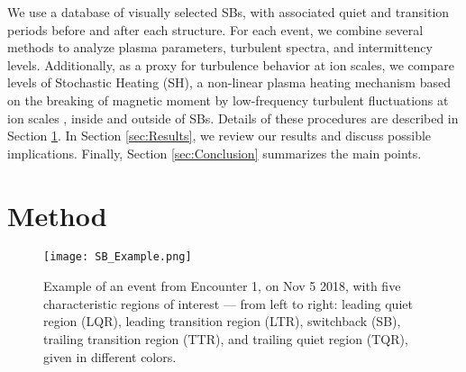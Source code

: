 \documentclass[]{aastex62}
\begin{document}
We use a database of visually selected SBs, with associated quiet and transition periods before and after each structure. For each event, we combine several methods to analyze plasma parameters, turbulent spectra, and intermittency levels. Additionally, as a proxy for turbulence behavior at ion scales, we compare levels of Stochastic Heating (SH), a non-linear plasma heating mechanism based on the breaking of magnetic moment by low-frequency turbulent fluctuations at ion scales \citep{Chandran_2010}, inside and outside of SBs. Details of these procedures are described in Section \ref{sec:Method}. In Section \ref{sec:Results}, we review our results and discuss possible implications. Finally, Section \ref{sec:Conclusion} summarizes the main points. 


\section{Method} 
\label{sec:Method}


\begin{figure}
\centering
\texttt{[image: SB\_Example.png]}
\caption{Example of an event from Encounter 1, on Nov 5 2018, with five characteristic regions of interest --- from left to right: leading quiet region (LQR), leading transition region (LTR), switchback (SB), trailing transition region (TTR), and trailing quiet region (TQR), given in different colors.}
\label{fig:SB_Example}
\end{figure}
\end{document}
